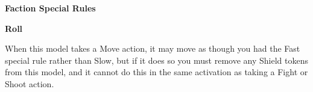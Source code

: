 \documentclass{article}
\begin{document}
\begin{multicols}{2}
{\vspace{0.6cm}
\setlength\extrarowheight{1.5pt}


\vspace{0.6cm}
\setlength\extrarowheight{1.5pt}


\vspace{0.6cm}
\setlength\extrarowheight{1.5pt}


\vspace{0.6cm}

\setlength\extrarowheight{1.5pt}


\vspace{0.6cm}

\setlength\extrarowheight{1.5pt}


\vspace{0.6cm}

\setlength\extrarowheight{1.5pt}


\vspace{0.6cm}

\setlength\extrarowheight{1.5pt}


\vspace{0.6cm}

\setlength\extrarowheight{1.5pt}


\vspace{0.6cm}

\setlength\extrarowheight{1.5pt}


\vspace{0.6cm}

\setlength\extrarowheight{1.5pt}


\vspace{0.6cm}

\setlength\extrarowheight{1.5pt}


}
\end{multicols}
\vspace{0.6cm}

{\large \textbf{Faction Special Rules}}
\vspace{0.3cm}
\begin{multicols}{2}
    {\scriptsize

    \begin{minipage}{9cm}
        {\normalsize \textbf{Roll}}
        \vspace{0.3cm}

        When this model takes a Move action, it may move as though
        you had the Fast special rule rather than Slow, but if it does
        so you must remove any Shield tokens from this model, and it
        cannot do this in the same activation as taking a Fight or
        Shoot action.
    \end{minipage}

    }
\end{multicols}
\end{document}
